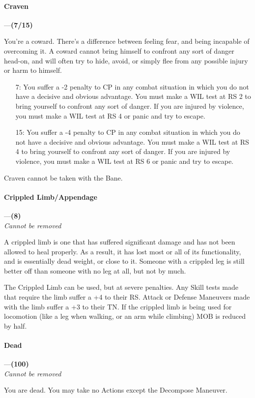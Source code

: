 \documentclass[oneside,11pt,english]{book}
\begin{document}
\paragraph{\label{bane:Craven}Craven}---\quad\textbf{(7/15) }\par
You're a coward. There's a difference between feeling fear, and being incapable of overcoming it. A coward cannot bring himself to confront any sort of danger head-on, and will often try to hide, avoid, or 
simply flee from any possible injury or harm to himself. 

\begin{itemize}
\item [7:] You suffer a -2 penalty to CP in any combat situation in which you do
  not have a decisive and obvious advantage. You must make a WIL test at RS 2 to
  bring yourself to confront any sort of danger. If you are injured by violence,
  you must make a WIL test at RS 4 or panic and try to escape.  
\item [15:] You suffer a -4 penalty to CP in any combat situation in which you
  do not have a decisive and obvious advantage. You must make a WIL test at RS 4
  to bring yourself to confront any sort of danger. If you are injured by
  violence, you must make a WIL test at RS 6 or panic and try to escape. 
\end{itemize}
Craven cannot be taken with the  Bane.
\paragraph{\label{bane:Crippled Limb/Appendage}Crippled Limb/Appendage}---\quad\textbf{(8)}\\
\textit{Cannot be removed}\par
A crippled limb is one that has suffered significant damage and has not been allowed to heal properly. As 
a result, it has lost most or all of its functionality, and is essentially dead
weight, or close to it. Someone with a crippled leg is still better off than
someone with no leg at all, but not by much. 


The Crippled Limb can be used, but at severe penalties. Any Skill tests made that require the limb suffer a +4 to their RS. Attack or Defense Maneuvers made with the limb suffer a +3 to their TN. If the crippled limb is being used for locomotion (like a leg when walking, or an arm while climbing) MOB is reduced by half.
\paragraph{\label{bane:Dead}Dead}---\quad\textbf{(100) }\\
\textit{Cannot be removed}\par
You are dead. You may take no Actions except the Decompose Maneuver.
\end{document}
